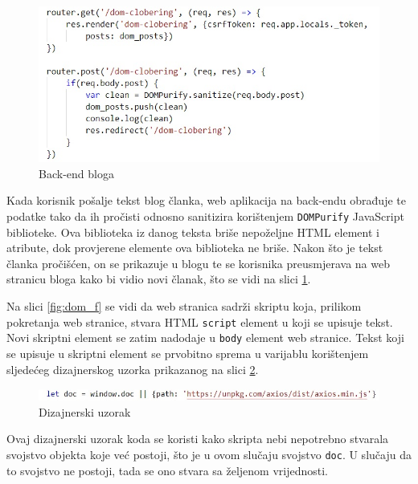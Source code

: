 \documentclass[12pt, oneside, onecolumn]{book}
\begin{document}
{\begin{figure}[H]
	\begin{center}
		\includegraphics[width=\textwidth]{dom_b.jpg}
		\caption{Back-end bloga} \label{fig:dom_b}
	\end{center}
\end{figure}

Kada korisnik pošalje tekst blog članka, web aplikacija na back-endu obrađuje te podatke tako da ih pročisti odnosno sanitizira korištenjem \texttt{DOMPurify} JavaScript biblioteke. Ova biblioteka iz danog teksta briše nepoželjne HTML element i atribute, dok provjerene elemente ova biblioteka ne briše. Nakon što je tekst članka pročišćen, on se prikazuje u blogu te se korisnika preusmjerava na web stranicu bloga kako bi vidio novi članak, što se vidi na slici \ref{fig:dom_b}.

Na slici \ref{fig:dom_f} se vidi da web stranica sadrži skriptu koja, prilikom pokretanja web stranice, stvara HTML \texttt{script} element u koji se upisuje tekst. Novi skriptni element se zatim nadodaje u \texttt{body} element web stranice. Tekst koji se upisuje u skriptni element se prvobitno sprema u varijablu korištenjem sljedećeg dizajnerskog uzorka prikazanog na slici \ref{fig:dom_pat}.

\begin{figure}[H]
	\begin{center}
		\includegraphics[width=\textwidth]{dom_pat.jpg}
		\caption{Dizajnerski uzorak} \label{fig:dom_pat}
	\end{center}
\end{figure}

Ovaj dizajnerski uzorak koda se koristi kako skripta nebi nepotrebno stvarala svojstvo objekta koje već postoji, što je u ovom slučaju svojstvo \texttt{doc}. U slučaju da to svojstvo ne postoji, tada se ono stvara sa željenom vrijednosti.

}
\end{document}
